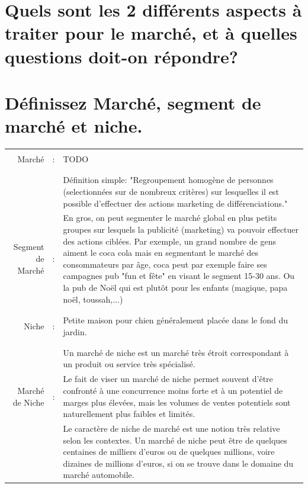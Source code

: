 \documentclass{article}
\begin{document}
\section{Quels sont les 2 différents aspects à traiter pour le marché, et à quelles questions doit-on répondre?}


\section{Définissez Marché, segment de marché et niche.}
\begin{tabular}{|rcl|}
\hline
&&\\
Marché & : & TODO\\ %
&&\\
\hline
&&\\
&& \multicolumn{1}{p{.8\textwidth}|}{Définition simple: "Regroupement homogène de personnes (selectionnées sur de nombreux critères) sur lesquelles il est possible d'effectuer des actions marketing de différenciations."}\\
Segment de Marché & : & \multicolumn{1}{p{.8\textwidth}|}{En gros, on peut segmenter le marché global en plus petits groupes sur lesquels la publicité (marketing) va pouvoir effectuer des actions ciblées. Par exemple, un grand nombre de gens aiment le coca cola mais en segmentant le marché des consommateurs par âge, coca peut par exemple faire ses campagnes pub "fun et fête" en visant le segment 15-30 ans. Ou la pub de Noël qui est plutôt pour les enfants (magique, papa noël, toussah,...)}\\
&&\\
\hline
&&\\
Niche & : & \multicolumn{1}{p{.8\textwidth}|}{Petite maison pour chien généralement placée dans le fond du jardin.}\\
&&\\
\hline
&&\\
				 &   & \multicolumn{1}{p{.8\textwidth}|}{Un marché de niche est un marché très étroit correspondant à un produit ou service très spécialisé.}\\
Marché de Niche & : & \multicolumn{1}{p{.8\textwidth}|}{Le fait de viser un marché de niche permet souvent d’être confronté à une concurrence moins forte et à un potentiel de marges plus élevées, mais les volumes de ventes potentiels sont naturellement plus faibles et limités.}\\
				 &  & \multicolumn{1}{p{.8\textwidth}|}{Le caractère de niche de marché est une notion très relative selon les contextes. Un marché de niche peut être de quelques centaines de milliers d’euros ou de quelques millions, voire dizaines de millions d’euros, si on se trouve dans le domaine du marché automobile.}\\

\end{tabular}
\end{document}
